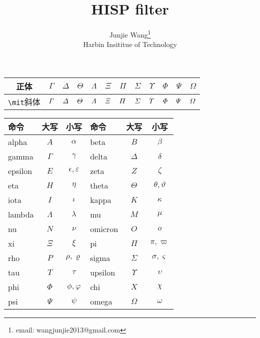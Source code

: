 \documentclass[a4paper, 11pt]{article}
\begin{document}
\begin{CJK}{UTF8}{gbsn}




\title{HISP filter}
\author{Junjie Wang\footnote{email: wangjunjie2013@gmail.com}\\[2ex]
 Harbin Insititue of Technology\\[2ex]
}
\date{}


\maketitle


 \begin{tabular}{|c|ccccccccccc|}
\hline
正体&$\Gamma$ & $\Delta$ & $\Theta$ & $\Lambda$ & $\Xi$ & $\Pi$ & $\Sigma$ & $\Upsilon$ & $\Phi$ & $\Psi$ & $\Omega$\\
\hline
\verb|\mit|斜体&$\mit\Gamma$ & $\mit\Delta$ & $\mit\Theta$ & $\mit\Lambda$ & $\mit\Xi$ & $\mit\Pi$ & $\mit\Sigma$ &  $\mit\Upsilon$ & $\mit\Phi$ & $\mit\Psi$ & $\mit\Omega$\\
\hline
\end{tabular}


 \begin{tabular}{|lcc|lcc|}
\hline
命令 & 大写 & 小写 & 命令 & 大写 & 小写 \\
\hline
  alpha & $A$ & $\alpha$ &  beta & $B$ &$\beta$  \\
  gamma & $\Gamma$ & $\gamma$  &  delta & $\Delta$ & $\delta$ \\
  epsilon & $E$ & $\epsilon,\varepsilon$ &  zeta & $Z$ & $\zeta$ \\
   eta & $H$ &$\eta$  &  theta & $\Theta$ & $\theta,\vartheta$ \\
  iota & $I$ & $\iota$ &   kappa & $K$ & $\kappa$ \\
  lambda & $\Lambda$ & $\lambda$  & mu & $M$ & $\mu$ \\
  nu & $N$ & $\nu$ & omicron & $O$ & $o$ \\
    xi & $\Xi$ & $\xi$  &   pi & $\Pi$ & $\pi,\varpi$ \\
    rho & $P$ & $\rho,\varrho$  &  sigma & $\Sigma$ & $\sigma,\varsigma$ \\
   tau & $T$ & $\tau$ &   upsilon & $\Upsilon$ & $\upsilon$ \\
  phi & $\Phi$ & $\phi,\varphi$ &  chi & $X$ & $\chi$ \\
  psi & $\Psi$ & $\psi$  &  omega & $\Omega$ &$\omega$ \\
\hline
\end{tabular}



\end{CJK}
\end{document}
